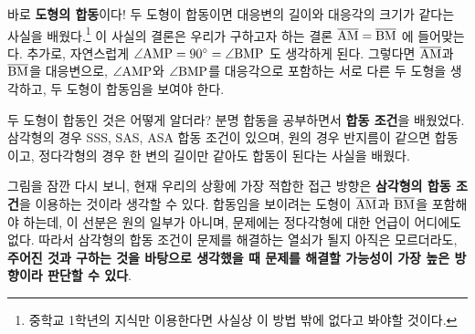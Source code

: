 바로 \textbf{도형의 합동}이다! 두 도형이 합동이면 대응변의 길이와 대응각의 크기가 같다는 사실을 배웠다.\footnote{중학교 1학년의 지식만 이용한다면 사실상 이 방법 밖에 없다고 봐야할 것이다.} 이 사실의 결론은 우리가 구하고자 하는 결론 \(\overline{\rm{AM}} = \overline{\rm{BM}}\) 에 들어맞는다. 추가로, 자연스럽게 \(\angle \rm{AMP} = 90^\circ = \angle \rm{BMP}\) 도 생각하게 된다. 그렇다면 \(\overline{\rm{AM}}\)과 \(\overline{\rm{BM}}\)을 대응변으로, \(\angle \rm{AMP}\)와 \(\angle \rm{BMP}\)를 대응각으로 포함하는 서로 다른 두 도형을 생각하고, 두 도형이 합동임을 보여야 한다.

두 도형이 합동인 것은 어떻게 알더라? 분명 합동을 공부하면서 \textbf{합동 조건}을 배웠었다. 삼각형의 경우 SSS, SAS, ASA 합동 조건이 있으며, 원의 경우 반지름이 같으면 합동이고, 정다각형의 경우 한 변의 길이만 같아도 합동이 된다는 사실을 배웠다.

그림을 잠깐 다시 보니, 현재 우리의 상황에 가장 적합한 접근 방향은 \textbf{삼각형의 합동 조건}을 이용하는 것이라 생각할 수 있다. 합동임을 보이려는 도형이 \(\overline{\rm{AM}}\)과 \(\overline{\rm{BM}}\)을 포함해야 하는데, 이 선분은 원의 일부가 아니며, 문제에는 정다각형에 대한 언급이 어디에도 없다. 따라서 삼각형의 합동 조건이 문제를 해결하는 열쇠가 될지 아직은 모르더라도, \textbf{주어진 것과 구하는 것을 바탕으로 생각했을 때 문제를 해결할 가능성이 가장 높은 방향이라 판단할 수 있다}.

\begin{wrapfigure}{R}{0.36\textwidth}
    \vspace*{-20px}
\end{wrapfigure}

